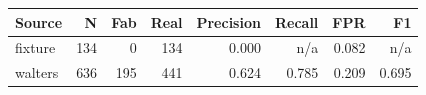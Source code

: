 \begin{tabular}{lrrrrrrr}
\toprule
Source & N & Fab & Real & Precision & Recall & FPR & F1 \\
\midrule
fixture & 134 & 0 & 134 & 0.000 & n/a & 0.082 & n/a \\
walters & 636 & 195 & 441 & 0.624 & 0.785 & 0.209 & 0.695 \\
\bottomrule
\end{tabular}
